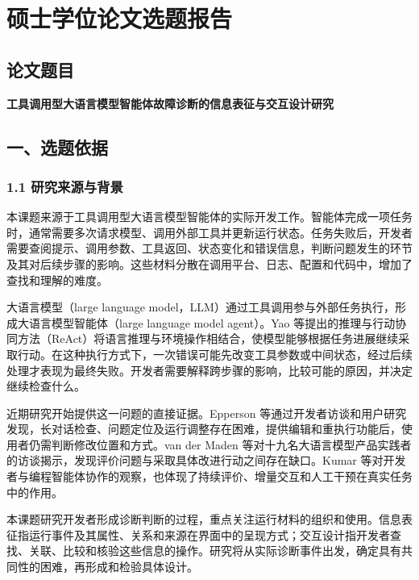 \chapter{硕士学位论文选题报告}\label{chap:selection-report}

\section{论文题目}

\begin{center}\textbf{工具调用型大语言模型智能体故障诊断的信息表征与交互设计研究}\end{center}

\section{一、选题依据}

\subsection{1.1 研究来源与背景}

本课题来源于工具调用型大语言模型智能体的实际开发工作。智能体完成一项任务时，通常需要多次请求模型、调用外部工具并更新运行状态。任务失败后，开发者需要查阅提示、调用参数、工具返回、状态变化和错误信息，判断问题发生的环节及其对后续步骤的影响。这些材料分散在调用平台、日志、配置和代码中，增加了查找和理解的难度。

大语言模型（large language model，LLM）通过工具调用参与外部任务执行，形成大语言模型智能体（large language model agent）。Yao 等\cite{yao2023react}提出的推理与行动协同方法（ReAct）将语言推理与环境操作相结合，使模型能够根据任务进展继续采取行动。在这种执行方式下，一次错误可能先改变工具参数或中间状态，经过后续处理才表现为最终失败。开发者需要解释跨步骤的影响，比较可能的原因，并决定继续检查什么。

近期研究开始提供这一问题的直接证据。Epperson 等\cite{ref02}通过开发者访谈和用户研究发现，长对话检查、问题定位及运行调整存在困难，提供编辑和重执行功能后，使用者仍需判断修改位置和方式。van der Maden 等\cite{ref01}对十九名大语言模型产品实践者的访谈揭示，发现评价问题与采取具体改进行动之间存在缺口。Kumar 等\cite{ref59}对开发者与编程智能体协作的观察，也体现了持续评价、增量交互和人工干预在真实任务中的作用。

本课题研究开发者形成诊断判断的过程，重点关注运行材料的组织和使用。信息表征指运行事件及其属性、关系和来源在界面中的呈现方式；交互设计指开发者查找、关联、比较和核验这些信息的操作。研究将从实际诊断事件出发，确定具有共同性的困难，再形成和检验具体设计。

